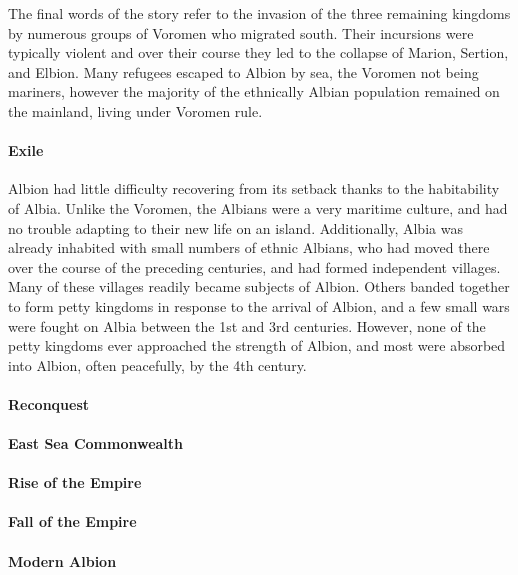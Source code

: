 	The final words of the story refer to the invasion of the three remaining kingdoms by numerous groups of Voromen who migrated south.  Their incursions were typically violent and over their course they led to the collapse of Marion, Sertion, and Elbion.  Many refugees escaped to Albion by sea, the Voromen not being mariners, however the majority of the ethnically Albian population remained on the mainland, living under Voromen rule.

	\paragraph{Exile}

	Albion had little difficulty recovering from its setback thanks to the habitability of Albia.  Unlike the Voromen, the Albians were a very maritime culture, and had no trouble adapting to their new life on an island.  Additionally, Albia was already inhabited with small numbers of ethnic Albians, who had moved there over the course of the preceding centuries, and had formed independent villages.  Many of these villages readily became subjects of Albion.  Others banded together to form petty kingdoms in response to the arrival of Albion, and a few small wars were fought on Albia between the 1st and 3rd centuries.  However, none of the petty kingdoms ever approached the strength of Albion, and most were absorbed into Albion, often peacefully, by the 4th century. 

	\paragraph{Reconquest}

	\paragraph{East Sea Commonwealth}

	\paragraph{Rise of the Empire}

	\paragraph{Fall of the Empire}

	\paragraph{Modern Albion}


